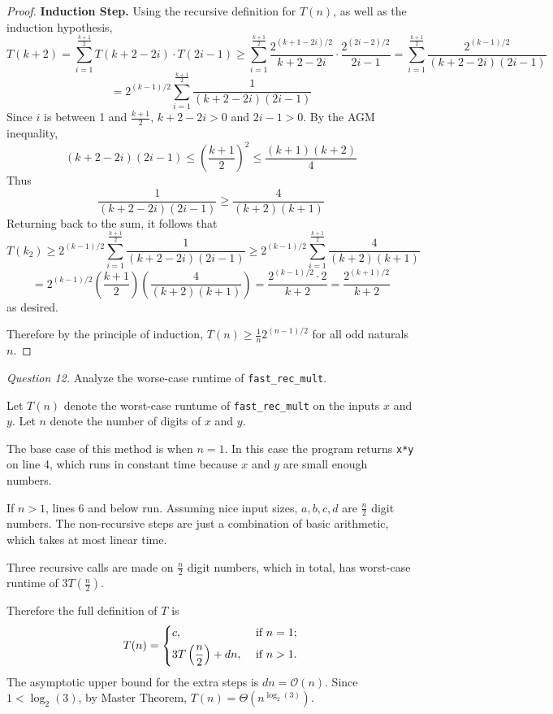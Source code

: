 \documentclass[11pt]{article}
\begin{document}
\begin{proof}
        \textbf{Induction Step.} Using the recursive definition for \(T(n)\), as well as the induction hypothesis,
        \[
            T(k+2) = \sum_{i=1}^{\frac{k+1}{2}} T(k+2-2i) \cdot T(2i - 1) \geq \sum_{i=1}^{\frac{k+1}{2}} \frac{2^{(k+1-2i) / 2}}{k+2-2i} \cdot \frac{2^{(2i-2) / 2}}{2i-1} = \sum_{i=1}^{\frac{k+1}{2}} \frac{2^{(k-1) / 2}}{(k+2-2i) (2i-1)}
        \]
        \[
            = 2^{(k-1) / 2}\sum_{i=1}^{\frac{k+1}{2}} \frac{1}{(k+2-2i) (2i-1)}
        \]
        Since \(i\) is between 1 and \(\frac{k+1}{2}\), \(k+2-2i >0\) and \(2i-1 >0\). By the AGM inequality,
        \[
            (k+2-2i)(2i-1)\leq \left(\frac{k+1}{2}\right)^2 \leq \frac{(k+1)(k+2)}{4}
        \]
        Thus
        \[
            \frac{1}{(k+2-2i) (2i-1)} \geq \frac{4}{(k+2)(k+1)}
        \]
        Returning back to the sum, it follows that
        \[
            T(k_2) \geq 2^{(k-1) / 2}\sum_{i=1}^{\frac{k+1}{2}} \frac{1}{(k+2-2i) (2i-1)} \geq 2^{(k-1) / 2}\sum_{i=1}^{\frac{k+1}{2}} \frac{4}{(k+2)(k+1)}
        \]
        \[
            = 2^{(k-1) / 2} \left( \frac{k+1}{2} \right) \left(\frac{4}{(k+2)(k+1)}\right) = \frac{2^{(k-1) / 2} \cdot 2}{k+2} = \frac{2^{(k+1) / 2}}{k+2}
        \]
        as desired.

        Therefore by the principle of induction, \(T(n) \geq \frac{1}{n}2^{(n-1) / 2}\) for all odd naturals \(n\).

    \end{proof}



    \textit{Question 12.} Analyze the worse-case runtime of \verb|fast_rec_mult|.

    Let \(T(n)\) denote the worst-case runtume of \verb|fast_rec_mult| on the inputs \(x\) and \(y\). Let \(n\) denote the number of digits of \(x\) and \(y\).

    The base case of this method is when \(n=1\). In this case the program returns \verb|x*y| on line 4, which runs in constant time because \(x\) and \(y\) are small enough numbers.

    If \(n >1\), lines 6 and below run. Assuming nice input sizes, \(a,b,c,d\) are \(\frac{n}{2}\) digit numbers. The non-recursive steps are just a combination of basic arithmetic, which takes at most linear time.

    Three recursive calls are made on \(\frac{n}{2}\) digit numbers, which in total, has worst-case runtime of \(3T(\frac{n}{2})\).

    Therefore the full definition of \(T\) is
    \[
        T(n) = \begin{dcases}
            c, &\text{ if } n = 1 ;\\
            3T\left(\frac{n}{2}\right) + dn, &\text{ if } n >1 .
        \end{dcases}
    \]
    The asymptotic upper bound for the extra steps is \(dn = \mathcal{O} (n)\). Since \(1 < \log _2(3)\), by Master Theorem, \(T(n) = \Theta (n^{\log _2(3)})\).
\end{document}
